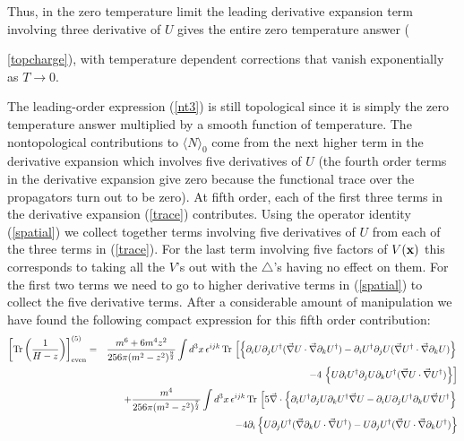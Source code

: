 \documentclass[a4paper,prd,showpacs,showkeys]{revtex4}
\begin{document}
Thus, in the zero temperature limit the leading derivative expansion term involving three derivative of $U$ gives the entire zero temperature answer ({\ref{topcharge}), with temperature dependent corrections that vanish exponentially as $T\to 0$. 

The leading-order expression (\ref{nt3}) is still topological since it is simply the zero temperature answer multiplied by a smooth function of temperature.
The nontopological contributions to $\langle N\rangle _0$ come from the next higher term in the derivative expansion which involves five derivatives of $U$ (the fourth order terms in the derivative expansion give zero because the functional trace over the propagators turn out to be zero). At fifth order, each of the first three terms in the derivative expansion ({\ref{trace}) contributes.
Using the operator identity (\ref{spatial}) we collect together terms involving five derivatives of $U$ from each of the three terms in (\ref{trace}). For the last term involving five factors of $V({\bf x})$ this corresponds to taking all the $V$'s out with the $\triangle$'s having no effect on them. For the first two terms we need to go to higher derivative terms in (\ref{spatial}) to collect the five derivative terms. After a considerable amount of manipulation we have found the following compact expression for this fifth order contribution:
\begin{eqnarray}
\left[ \textrm{Tr}\left(\frac{1}{H-z} \right) \right]^{(5)} _{\rm{even}}
 &=& \frac{m^6 +6 m^4 z^2}{256 \pi (m^2 -z^2)^{\frac{9}{2}}}
\int d^3x \, \epsilon^{ijk} \, \textrm{Tr}\, \left[ \left\{ \partial _i U \partial _j U^{\dagger}(\vec{\nabla}U \cdot \vec{\nabla}\partial _k U^{\dagger})- \partial _i U^{\dagger} \partial _j U (\vec{\nabla}U^{\dagger} \cdot
  \vec{\nabla}\partial _k U)\right \} \right.
  \nonumber \\
& & \left. - 4\,\left \{ U \partial_i U^{\dagger}\partial_j U \partial_k
  U^{\dagger}(\vec{\nabla}U \cdot \vec{\nabla} U^{\dagger})\right \}
  \right] \nonumber \\
& & +\frac{ m^4}{256 \pi (m^2 -z^2)^{\frac{7}{2}}} \int d^3x \, \epsilon^{ijk} \, \textrm{Tr}\, \left[5 \vec{\nabla} \cdot \left \{\partial_iU^{\dagger} \partial_j U \partial_k U^{\dagger} \vec{\nabla}U-\partial_i U \partial_j U^{\dagger} \partial_k U \vec{\nabla}U^{\dagger}\right\} \right. \nonumber \\
& & -4 \partial_i \left\{ U \partial_j U^{\dagger} (\vec{\nabla}\partial_k U \cdot \vec{\nabla}U^{\dagger})-U \partial_j U^{\dagger}(\vec{\nabla}U \cdot \vec{\nabla}\partial_k U^{\dagger})\right \} \nonumber \\

\end{eqnarray}}}
\end{document}
